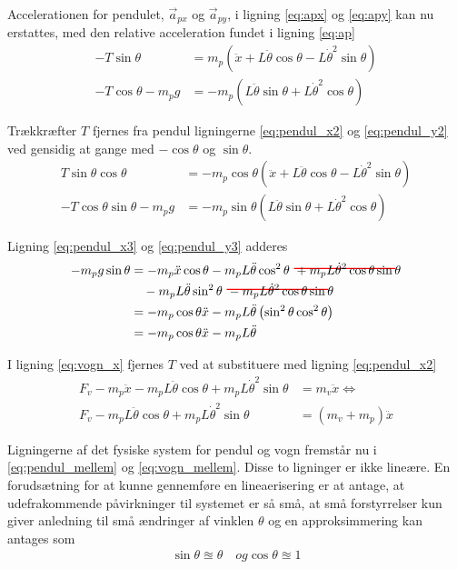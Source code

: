 Accelerationen for pendulet, $\vec{a}_{px}$ og $\vec{a}_{py}$, i ligning \ref{eq:apx} og \ref{eq:apy} kan nu erstattes, med den relative acceleration fundet i ligning \ref{eq:ap}
\begin{align}
-T\sin{\theta} &= m_p \left( \ddot{x} + L\ddot{\theta}\cos{\theta} - L\dot{\theta}^2\sin{\theta} \right)  \label{eq:pendul_x2}\\
-T\cos{\theta} - m_p g &=  -m_p \left( L\ddot{\theta}\sin{\theta} + L\dot{\theta}^2\cos{\theta}  \right) \label{eq:pendul_y2}
\end{align} 

Trækkræfter $T$ fjernes fra pendul ligningerne \ref{eq:pendul_x2} og \ref{eq:pendul_y2} ved gensidig at gange med $-\cos{\theta}$ og $\sin{\theta}$. 
\begin{align}
T\sin{\theta}\cos{\theta} &=   -m_p \cos{\theta} \left( \ddot{x} + L\ddot{\theta}\cos{\theta} - L\dot{\theta}^2\sin{\theta} \right) \label{eq:pendul_x3} \\
-T\cos{\theta}\sin{\theta} - m_p g &=  -m_p \sin{\theta} \left( L\ddot{\theta}\sin{\theta} + L\dot{\theta}^2\cos{\theta}\right) \label{eq:pendul_y3}
\end{align}

Ligning \ref{eq:pendul_x3} og \ref{eq:pendul_y3} adderes
\begin{align}
-m_p g \sin{\theta}    &= - m_p \ddot{x}\cos{\theta}
						- m_p L\ddot{\theta}\cos^2\theta\
						\hcancel[red]{+ m_p L \dot{\theta}^2\cos{\theta}\sin{\theta}}\\
					   &\quad - m_p L\ddot{\theta}\sin^2\theta\
					    \hcancel[red]{- m_p L \dot{\theta}^2\cos{\theta}\sin{\theta}} \\
					   &=- m_p \cos{\theta}\ddot{x} - m_p L \ddot{\theta} \left(\sin^2 \theta \cos^2 \theta \right) \\
					   &=- m_p \cos{\theta}\ddot{x} - m_p L \ddot{\theta} \label{eq:pendul_mellem}
\end{align}

I ligning \ref{eq:vogn_x} fjernes $T$ ved at substituere med ligning \ref{eq:pendul_x2}
\begin{align}
F_v - m_p \ddot{x} - m_p L\ddot{\theta}\cos{\theta} + m_p L\dot{\theta}^2\sin{\theta} &= m_v \ddot{x} \Leftrightarrow \\
F_v - m_p L\ddot{\theta}\cos{\theta} + m_p L\dot{\theta}^2\sin{\theta} &= (m_v + m_p)  \ddot{x} \label{eq:vogn_mellem}
\end{align}

Ligningerne af det fysiske system for pendul og vogn fremstår nu i \ref{eq:pendul_mellem} og \ref{eq:vogn_mellem}. Disse to ligninger er ikke lineære. En forudsætning for at kunne gennemføre en lineaerisering er at antage, at udefrakommende påvirkninger til systemet er så små, at små forstyrrelser kun giver anledning til små ændringer af vinklen $\theta$ og en approksimmering kan antages som
\begin{align}
\sin{\theta} \approxeq \theta \quad og \cos{\theta} \approxeq 1
\end{align} 

